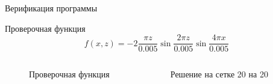 \documentclass[ignoreonframetext,unicode]{beamer}
\begin{document}
\begin{frame}{Верификация программы}
	\vspace*{-1mm}
	\begin{block}{Проверочная функция}
		\begin{equation*}
			f(x, z) = -2 \frac{\pi z}{0.005} \sin{\frac{2 \pi z}{0.005}} \sin{\frac{4 \pi x}{0.005}}
			\label{check_func_2}
		\end{equation*}
	\end{block}
	
	\vspace*{-6mm}
	\begin{columns}
		
		
		\begin{figure}[!htbp]
			\caption{Проверочная функция}
			\label{check_func_2_pic}
		\end{figure}
		
		\begin{figure}[!htbp]
			\caption{Решение на сетке 20 на 20}
			\label{res_check_func_2}
		\end{figure}
		

\end{columns}
\end{frame}
\end{document}
